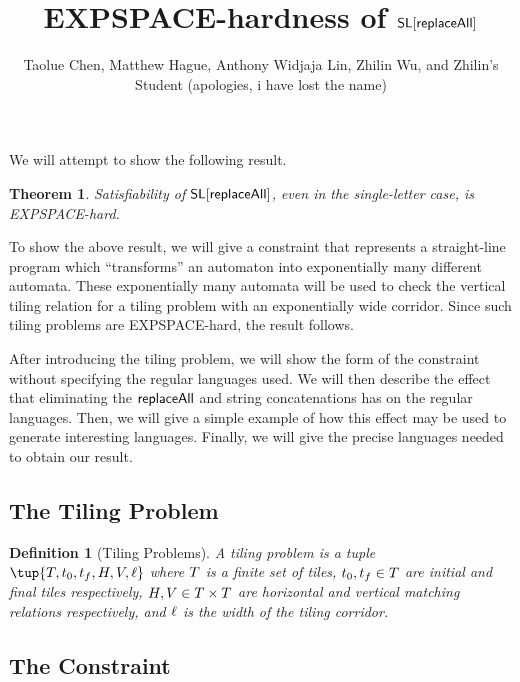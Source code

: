 \documentclass{article}
\title{EXPSPACE-hardness of $\mathsf{SL}[\mathsf{replaceAll}]$}
\author{Taolue Chen, Matthew Hague, Anthony Widjaja Lin, Zhilin Wu, and Zhilin's Student (apologies, i have lost the name)}
\date{}
\newtheorem{theorem}{Theorem}
\newtheorem{definition}{Definition}
\begin{document}
\maketitle

We will attempt to show the following result.

\begin{theorem}
    Satisfiability of $\mathsf{SL}[\mathsf{replaceAll}]$, even in the single-letter case, is EXPSPACE-hard.
\end{theorem}

To show the above result, we will give a constraint that represents a straight-line program which ``transforms'' an automaton into exponentially many different automata.
These exponentially many automata will be used to check the vertical tiling relation for a tiling problem with an exponentially wide corridor.
Since such tiling problems are EXPSPACE-hard, the result follows.

After introducing the tiling problem, we will show the form of the constraint without specifying the regular languages used.
We will then describe the effect that eliminating the $\mathsf{replaceAll}$ and string concatenations has on the regular languages.
Then, we will give a simple example of how this effect may be used to generate interesting languages.
Finally, we will give the precise languages needed to obtain our result.

\subsection*{The Tiling Problem}

\begin{definition}[Tiling Problems]
    A \emph{tiling problem} is a tuple
    $\tup{\tiles, \inittile, \fintile, \hcons, \vcons, \width}$
    where
        $T$ is a finite set of tiles,
        $t_0, t_f \in T$ are initial and final tiles respectively,
        $H, V \in T \times T$
            are horizontal and vertical matching relations respectively, and
        $\ell$ is the width of the tiling corridor.
\end{definition}




\subsection*{The Constraint}
\end{document}
